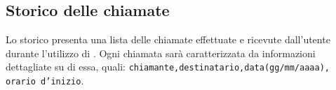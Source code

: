 
\subsection{Storico delle chiamate}
Lo storico presenta una lista delle chiamate effettuate e ricevute dall'utente durante l'utilizzo di \caName{}. Ogni chiamata sarà caratterizzata da informazioni dettagliate su di essa, quali: \texttt{chiamante,destinatario,data(gg/mm/aaaa), orario d'inizio}.




